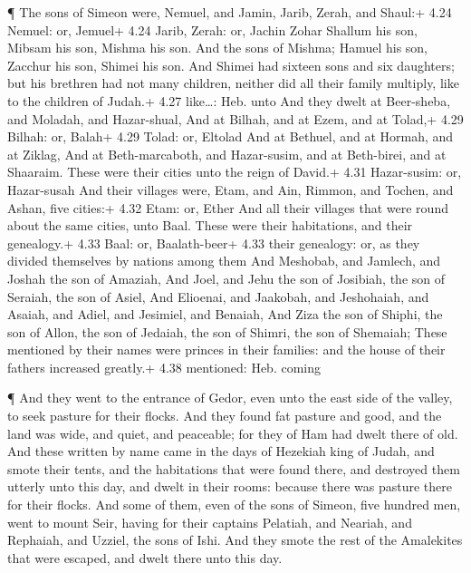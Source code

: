  ¶ The sons of Simeon were, Nemuel, and Jamin, Jarib,
Zerah, and Shaul:+ 4.24 Nemuel: or, Jemuel+ 4.24 Jarib, Zerah: or,
Jachin Zohar  Shallum his son, Mibsam his son, Mishma his
son.  And the sons of Mishma; Hamuel his son, Zacchur his
son, Shimei his son.  And Shimei had sixteen sons and six
daughters; but his brethren had not many children, neither did all their
family multiply, like to the children of Judah.+ 4.27 like\ldots: Heb.
unto  And they dwelt at Beer-sheba, and Moladah, and
Hazar-shual,  And at Bilhah, and at Ezem, and at Tolad,+
4.29 Bilhah: or, Balah+ 4.29 Tolad: or, Eltolad  And at
Bethuel, and at Hormah, and at Ziklag,  And at
Beth-marcaboth, and Hazar-susim, and at Beth-birei, and at Shaaraim.
These were their cities unto the reign of David.+ 4.31 Hazar-susim: or,
Hazar-susah  And their villages were, Etam, and Ain,
Rimmon, and Tochen, and Ashan, five cities:+ 4.32 Etam: or, Ether
 And all their villages that were round about the same
cities, unto Baal. These were their habitations, and their genealogy.+
4.33 Baal: or, Baalath-beer+ 4.33 their genealogy: or, as they divided
themselves by nations among them  And Meshobab, and
Jamlech, and Joshah the son of Amaziah,  And Joel, and Jehu
the son of Josibiah, the son of Seraiah, the son of Asiel, 
And Elioenai, and Jaakobah, and Jeshohaiah, and Asaiah, and Adiel, and
Jesimiel, and Benaiah,  And Ziza the son of Shiphi, the son
of Allon, the son of Jedaiah, the son of Shimri, the son of Shemaiah;
 These mentioned by their names were princes in their
families: and the house of their fathers increased greatly.+ 4.38
mentioned: Heb. coming

 ¶ And they went to the entrance of Gedor, even unto the
east side of the valley, to seek pasture for their flocks. 
And they found fat pasture and good, and the land was wide, and quiet,
and peaceable; for they of Ham had dwelt there of old.  And
these written by name came in the days of Hezekiah king of Judah, and
smote their tents, and the habitations that were found there, and
destroyed them utterly unto this day, and dwelt in their rooms: because
there was pasture there for their flocks.  And some of
them, even of the sons of Simeon, five hundred men, went to mount Seir,
having for their captains Pelatiah, and Neariah, and Rephaiah, and
Uzziel, the sons of Ishi.  And they smote the rest of the
Amalekites that were escaped, and dwelt there unto this day.

